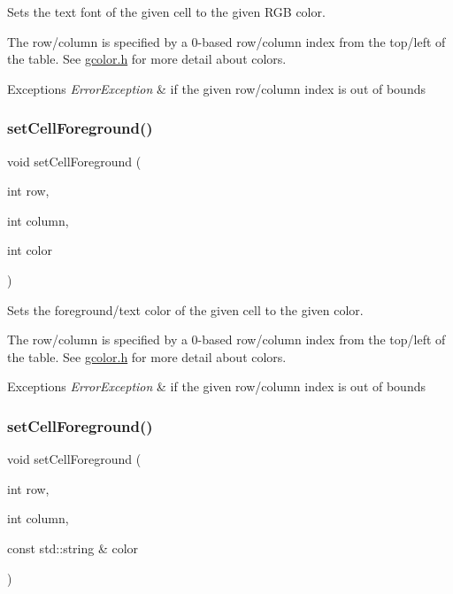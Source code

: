 Sets the text font of the given cell to the given R\+GB color. 

The row/column is specified by a 0-\/based row/column index from the top/left of the table. See \mbox{\hyperlink{gcolor_8h_source}{gcolor.\+h}} for more detail about colors. 
\begin{DoxyExceptions}{Exceptions}
{\em Error\+Exception} & if the given row/column index is out of bounds \\
\hline
\end{DoxyExceptions}
\mbox{\label{classGTable_a19969b2f2b0cbf219333b02c047b2e7e}} 
\subsubsection{\texorpdfstring{set\+Cell\+Foreground()}{setCellForeground()}\hspace{0.1cm}{\footnotesize\ttfamily [1/2]}}
{\footnotesize\ttfamily void set\+Cell\+Foreground (\begin{DoxyParamCaption}\item[{int}]{row,  }\item[{int}]{column,  }\item[{int}]{color }\end{DoxyParamCaption})\hspace{0.3cm}{\ttfamily [virtual]}}



Sets the foreground/text color of the given cell to the given color. 

The row/column is specified by a 0-\/based row/column index from the top/left of the table. See \mbox{\hyperlink{gcolor_8h_source}{gcolor.\+h}} for more detail about colors. 
\begin{DoxyExceptions}{Exceptions}
{\em Error\+Exception} & if the given row/column index is out of bounds \\
\hline
\end{DoxyExceptions}
\mbox{\label{classGTable_ab0bdc2afa7ef003fa5e8ab6eb25a7282}} 
\subsubsection{\texorpdfstring{set\+Cell\+Foreground()}{setCellForeground()}\hspace{0.1cm}{\footnotesize\ttfamily [2/2]}}
{\footnotesize\ttfamily void set\+Cell\+Foreground (\begin{DoxyParamCaption}\item[{int}]{row,  }\item[{int}]{column,  }\item[{const std\+::string \&}]{color }\end{DoxyParamCaption})\hspace{0.3cm}{\ttfamily [virtual]}}



